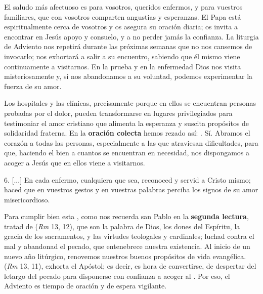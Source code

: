 El saludo más afectuoso es para vosotros, queridos enfermos, y para vuestros familiares, que con vosotros comparten angustias y esperanzas. El Papa está espiritualmente cerca de vosotros y os asegura su oración diaria; os invita a encontrar en Jesús apoyo y consuelo, y a no perder jamás la confianza. La liturgia de Adviento nos repetirá durante las próximas semanas que no nos cansemos de invocarlo; nos exhortará a salir a su encuentro, sabiendo que él mismo viene continuamente a visitarnos. En la prueba y en la enfermedad Dios nos visita misteriosamente y, si nos abandonamos a su voluntad, podemos experimentar la fuerza de su amor.

Los hospitales y las clínicas, precisamente porque en ellos se encuentran personas probadas por el dolor, pueden transformarse en lugares privilegiados para testimoniar el amor cristiano que alimenta la esperanza y suscita propósitos de solidaridad fraterna. En la \textbf{oración colecta} hemos rezado así: . Sí. Abramos el corazón a todas las personas, especialmente a las que atraviesan dificultades, para que, haciendo el bien a cuantos se encuentran en necesidad, nos dispongamos a acoger a Jesús que en ellos viene a visitarnos.

6. {[}...{]} En cada enfermo, cualquiera que sea, reconoced y servid a Cristo mismo; haced que en vuestros gestos y en vuestras palabras perciba los signos de su amor misericordioso.

Para cumplir bien esta , como nos recuerda san Pablo en la \textbf{segunda lectura}, tratad de  (\emph{Rm} 13, 12), que son la palabra de Dios, los dones del Espíritu, la gracia de los sacramentos, y las virtudes teologales y cardinales; luchad contra el mal y abandonad el pecado, que entenebrece nuestra existencia. Al inicio de un nuevo año litúrgico, renovemos nuestros buenos propósitos de vida evangélica.  (\emph{Rm} 13, 11), exhorta el Apóstol; es decir, es hora de convertirse, de despertar del letargo del pecado para disponerse con confianza a acoger al . Por eso, el Adviento es tiempo de oración y de espera vigilante.

